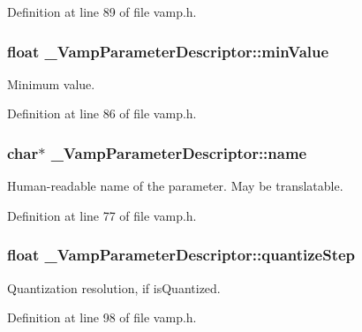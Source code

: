 Definition at line 89 of file vamp.\+h.

\subsubsection[{\texorpdfstring{min\+Value}{minValue}}]{\setlength{\rightskip}{0pt plus 5cm}float \+\_\+\+Vamp\+Parameter\+Descriptor\+::min\+Value}\hypertarget{struct___vamp_parameter_descriptor_ab59c84f0bbe0d4d0c578d893c087b0db}{}\label{struct___vamp_parameter_descriptor_ab59c84f0bbe0d4d0c578d893c087b0db}
Minimum value. 

Definition at line 86 of file vamp.\+h.

\subsubsection[{\texorpdfstring{name}{name}}]{ char$\ast$ \+\_\+\+Vamp\+Parameter\+Descriptor\+::name}\hypertarget{struct___vamp_parameter_descriptor_abba810bce9656f6002777f6c3f655957}{}\label{struct___vamp_parameter_descriptor_abba810bce9656f6002777f6c3f655957}
Human-\/readable name of the parameter. May be translatable. 

Definition at line 77 of file vamp.\+h.

\subsubsection[{\texorpdfstring{quantize\+Step}{quantizeStep}}]{\setlength{\rightskip}{0pt plus 5cm}float \+\_\+\+Vamp\+Parameter\+Descriptor\+::quantize\+Step}\hypertarget{struct___vamp_parameter_descriptor_a68c91fd3fc0b0b3617c2d343fe32d0e5}{}\label{struct___vamp_parameter_descriptor_a68c91fd3fc0b0b3617c2d343fe32d0e5}
Quantization resolution, if is\+Quantized. 

Definition at line 98 of file vamp.\+h.

